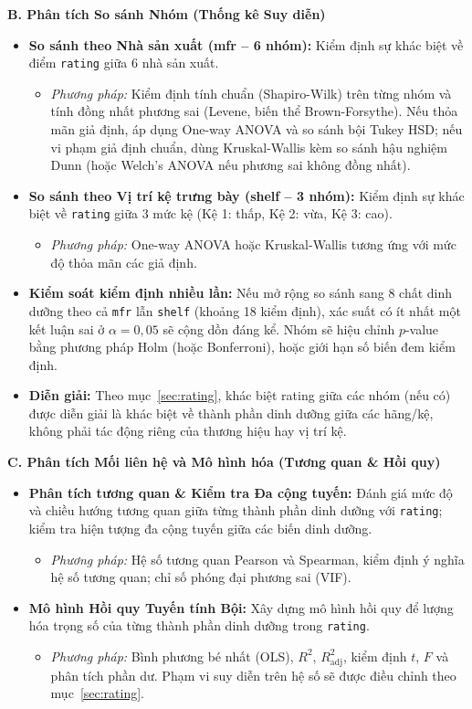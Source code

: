\documentclass[12pt,a4paper]{article}
\begin{document}
\textbf{B. Phân tích So sánh Nhóm (Thống kê Suy diễn)}
\begin{itemize}
  \item \textbf{So sánh theo Nhà sản xuất (mfr -- 6 nhóm):} Kiểm định sự khác biệt về điểm
  \texttt{rating} giữa 6 nhà sản xuất.
  \begin{itemize}
    \item \textit{Phương pháp:} Kiểm định tính chuẩn (Shapiro-Wilk) trên từng nhóm và tính
    đồng nhất phương sai (Levene, biến thể Brown-Forsythe). Nếu thỏa mãn giả định, áp dụng
    One-way ANOVA và so sánh bội Tukey HSD; nếu vi phạm giả định chuẩn, dùng Kruskal-Wallis kèm
    so sánh hậu nghiệm Dunn (hoặc Welch's ANOVA nếu phương sai không đồng nhất).
  \end{itemize}
  \item \textbf{So sánh theo Vị trí kệ trưng bày (shelf -- 3 nhóm):} Kiểm định sự khác biệt
  về \texttt{rating} giữa 3 mức kệ (Kệ 1: thấp, Kệ 2: vừa, Kệ 3: cao).
  \begin{itemize}
    \item \textit{Phương pháp:} One-way ANOVA hoặc Kruskal-Wallis tương ứng với mức độ thỏa
    mãn các giả định.
  \end{itemize}
  \item \textbf{Kiểm soát kiểm định nhiều lần:} Nếu mở rộng so sánh sang 8 chất dinh dưỡng
  theo cả \texttt{mfr} lẫn \texttt{shelf} (khoảng 18 kiểm định), xác suất có ít nhất một kết
  luận sai ở $\alpha = 0{,}05$ sẽ cộng dồn đáng kể. Nhóm sẽ hiệu chỉnh $p$-value bằng phương
  pháp Holm (hoặc Bonferroni), hoặc giới hạn số biến đem kiểm định.
  \item \textbf{Diễn giải:} Theo mục~\ref{sec:rating}, khác biệt rating giữa các nhóm (nếu
  có) được diễn giải là khác biệt về thành phần dinh dưỡng giữa các hãng/kệ, không phải tác
  động riêng của thương hiệu hay vị trí kệ.
\end{itemize}

\textbf{C. Phân tích Mối liên hệ và Mô hình hóa (Tương quan \& Hồi quy)}
\begin{itemize}
  \item \textbf{Phân tích tương quan \& Kiểm tra Đa cộng tuyến:} Đánh giá mức độ và chiều
  hướng tương quan giữa từng thành phần dinh dưỡng với \texttt{rating}; kiểm tra hiện tượng
  đa cộng tuyến giữa các biến dinh dưỡng.
  \begin{itemize}
    \item \textit{Phương pháp:} Hệ số tương quan Pearson và Spearman, kiểm định ý nghĩa hệ số
    tương quan; chỉ số phóng đại phương sai (VIF).
  \end{itemize}
  \item \textbf{Mô hình Hồi quy Tuyến tính Bội:} Xây dựng mô hình hồi quy để lượng hóa trọng
  số của từng thành phần dinh dưỡng trong \texttt{rating}.
  \begin{itemize}
    \item \textit{Phương pháp:} Bình phương bé nhất (OLS), $R^2$, $R^2_{\text{adj}}$, kiểm định
    $t$, $F$ và phân tích phần dư. Phạm vi suy diễn trên hệ số sẽ được điều chỉnh theo
    mục~\ref{sec:rating}.
  \end{itemize}
\end{itemize}
\end{document}
